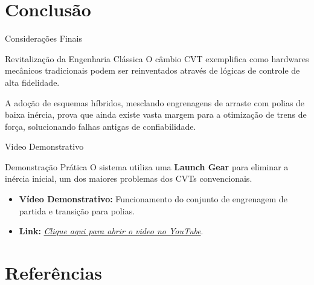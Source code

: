 \documentclass{beamer}
\begin{document}
  \section{Conclusão}

  \begin{frame}{Considerações Finais}
    \begin{block}{Revitalização da Engenharia Clássica}
    O câmbio CVT exemplifica como hardwares mecânicos tradicionais podem ser reinventados através de lógicas de controle de alta fidelidade.
    \end{block}
    
    \vspace{0.5cm}
    A adoção de esquemas híbridos, mesclando engrenagens de arraste com polias de baixa inércia, prova que ainda existe vasta margem para a otimização de trens de força, solucionando falhas antigas de confiabilidade.
  \end{frame}

    \begin{frame}{Video Demonstrativo}

        \begin{block}{Demonstração Prática}
            O sistema utiliza uma \textbf{Launch Gear} para eliminar a inércia inicial, um dos maiores problemas dos CVTs convencionais.
        \end{block}
        
        \begin{itemize}
            \item \textbf{Vídeo Demonstrativo:} Funcionamento do conjunto de engrenagem de partida e transição para polias.
            \item \textbf{Link:} \href{https://www.youtube.com/shorts/F-I2-d2PEBk}{\textit{Clique aqui para abrir o video no YouTube}}.
        \end{itemize}

            
    \end{frame}

  \section{Referências}
\end{document}
